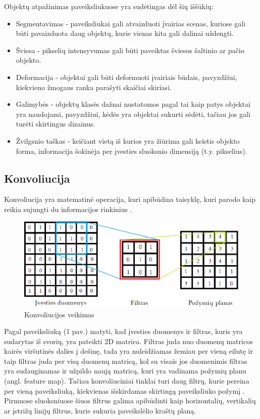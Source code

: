\documentclass{VUMIFPSbakalaurinis}
\begin{document}
Objektų atpažinimas paveiksliukuose yra sudėtingas dėl šių iššūkių:
\begin{itemize}
\item Segmentavimas - paveiksliukai gali atvaizduoti įvairias scenas, kuriose gali būti pavaizduota daug objektų, kurie vienas kita gali dalinai uždengti.
\item Šviesa - pikselių intensyvumas gali būti paveiktas šviesos šaltinio ar pačio objekto.
\item Deformacija - objektai gali būti deformuoti įvairiais būdais, pavyzdžiui, kiekvieno žmogaus ranka parašyti skaičiai skiriasi.
\item Galimybės - objektų klasės dažnai nustatomos pagal tai kaip patys objektai yra naudojami, pavyzdžiui, kėdės yra objektai sukurti sėdėti, tačiau jos gali turėti skirtingus dizainus.
\item Žvilgsnio taškas - keičiant vietą iš kurios yra žiūrima gali keistis objekto forma, informacija šokinėja per įvesties sluoksnio dimensiją (t.y. pikselius). 
\end{itemize}

\subsection{Konvoliucija}
Konvoliucija yra matematinė operacija, kuri apibūdina taisyklę, kuri parodo kaip reikia sujungti du informacijos rinkinius \cite{Convolution-book}. 

\begin{figure}[h]
    \centering
    \includegraphics[width=1\textwidth]{img/matrica.png}
    \caption{Konvoliucijos veikimas}
\end{figure}

Pagal paveiksliuką (1 pav.) matyti, kad įvesties duomenys ir filtras, kuris yra sudarytas iš svorių, yra pateikti 2D matrica. Filtras juda nuo duomenų matricos kairės viršutinės dalies į dešinę, 
tada yra nuleidžiamas žemiau per vieną eilutę ir taip filtras juda per visą duomenų matricą, kol su visais jos duomenimis filtras yra sudauginamas ir užpildo naują matricą, kuri 
yra vadinama požymių planu (angl. feature map).
Tačiau konvoliuciniai tinklai turi daug filtrų, kurie pereina per vieną paveiksliuką, kiekvienas išskirdamas skirtingą paveiksliuko požymį \cite{DBLP:journals/corr/abs-1708-08711}.
Pirmuose sluoksniuose šiuos filtrus galima apibūdinti kaip horizontalių, vertikalių ar įstrižų linijų filtrus, kurie sukuria paveikslėlio 
kraštų planą.
\end{document}
